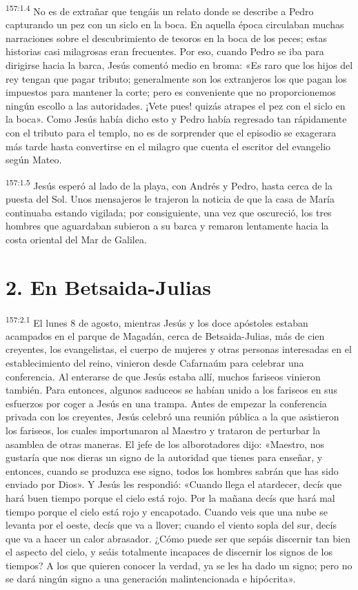 \par 
\textsuperscript{157:1.4} No es de extrañar que tengáis un relato donde se describe a Pedro capturando un pez con un siclo en la boca. En aquella época circulaban muchas narraciones sobre el descubrimiento de tesoros en la boca de los peces; estas historias casi milagrosas eran frecuentes. Por eso, cuando Pedro se iba para dirigirse hacia la barca, Jesús comentó medio en broma: «Es raro que los hijos del rey tengan que pagar tributo; generalmente son los extranjeros los que pagan los impuestos para mantener la corte; pero es conveniente que no proporcionemos ningún escollo a las autoridades. ¡Vete pues! quizás atrapes el pez con el siclo en la boca». Como Jesús había dicho esto y Pedro había regresado tan rápidamente con el tributo para el templo, no es de sorprender que el episodio se exagerara más tarde hasta convertirse en el milagro que cuenta el escritor del evangelio según Mateo.

\par 
\textsuperscript{157:1.5} Jesús esperó al lado de la playa, con Andrés y Pedro, hasta cerca de la puesta del Sol. Unos mensajeros le trajeron la noticia de que la casa de María continuaba estando vigilada; por consiguiente, una vez que oscureció, los tres hombres que aguardaban subieron a su barca y remaron lentamente hacia la costa oriental del Mar de Galilea.

\section*{2. En Betsaida-Julias}
\par 
\textsuperscript{157:2.1} El lunes 8 de agosto, mientras Jesús y los doce apóstoles estaban acampados en el parque de Magadán, cerca de Betsaida-Julias, más de cien creyentes, los evangelistas, el cuerpo de mujeres y otras personas interesadas en el establecimiento del reino, vinieron desde Cafarnaúm para celebrar una conferencia. Al enterarse de que Jesús estaba allí, muchos fariseos vinieron también. Para entonces, algunos saduceos se habían unido a los fariseos en sus esfuerzos por coger a Jesús en una trampa. Antes de empezar la conferencia privada con los creyentes, Jesús celebró una reunión pública a la que asistieron los fariseos, los cuales importunaron al Maestro y trataron de perturbar la asamblea de otras maneras. El jefe de los alborotadores dijo: «Maestro, nos gustaría que nos dieras un signo de la autoridad que tienes para enseñar, y entonces, cuando se produzca ese signo, todos los hombres sabrán que has sido enviado por Dios». Y Jesús les respondió: «Cuando llega el atardecer, decís que hará buen tiempo porque el cielo está rojo. Por la mañana decís que hará mal tiempo porque el cielo está rojo y encapotado. Cuando veis que una nube se levanta por el oeste, decís que va a llover; cuando el viento sopla del sur, decís que va a hacer un calor abrasador. ¿Cómo puede ser que sepáis discernir tan bien el aspecto del cielo, y seáis totalmente incapaces de discernir los signos de los tiempos? A los que quieren conocer la verdad, ya se les ha dado un signo; pero no se dará ningún signo a una generación malintencionada e hipócrita».

